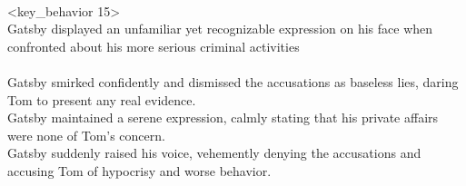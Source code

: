 \begin{tcolorbox}[title = {Behavior Chain}, breakable]
\\<key\_behavior 15>\\
Gatsby displayed an unfamiliar yet recognizable expression on his face when confronted about his more serious criminal activities
\\<distracters 15>\\
Gatsby smirked confidently and dismissed the accusations as baseless lies, daring Tom to present any real evidence.\\
Gatsby maintained a serene expression, calmly stating that his private affairs were none of Tom's concern.\\
Gatsby suddenly raised his voice, vehemently denying the accusations and accusing Tom of hypocrisy and worse behavior.\\
\end{tcolorbox}




